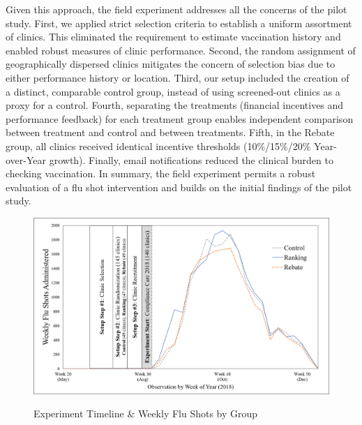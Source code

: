 Given this approach, the field experiment addresses all the concerns of the pilot study. First, we applied strict selection criteria to establish a uniform assortment of clinics. This eliminated the requirement to estimate vaccination history and enabled robust measures of clinic performance. Second, the random assignment of geographically dispersed clinics mitigates the concern of selection bias due to either performance history or location. Third, our setup included the creation of a distinct, comparable control group, instead of using screened-out clinics as a proxy for a control. Fourth, separating the treatments (financial incentives and performance feedback) for each treatment group enables independent comparison between treatment and control and between treatments. Fifth, in the Rebate group, all clinics received identical incentive thresholds (10\%/15\%/20\% Year-over-Year growth). Finally, email notifications reduced the clinical burden to checking vaccination. In summary, the field experiment permits a robust evaluation of a flu shot intervention and builds on the initial findings of the pilot study. 

 \begin{figure}[htbp]
     \centering
     \caption{Experiment Timeline \& Weekly Flu Shots by Group} %
     \includegraphics[scale=0.6]{Figures/CC/Figure B.1 - Experiment Timeline and Weekly Flu Shots by Group.png}     
     \label{fig:exp_timeline}
 \end{figure} 

